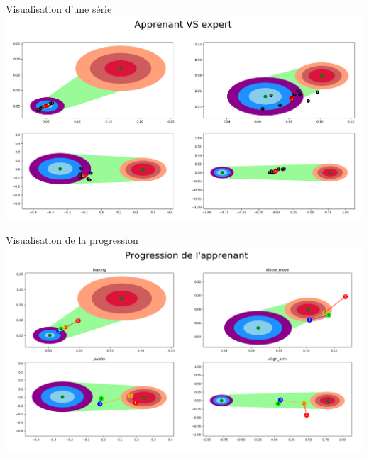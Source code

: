 \documentclass[svgnames]{beamer}
\begin{document}
	\begin{frame}{Visualisation d'une série}
		\centering
		\includegraphics[scale=0.27]{img/feedback_grp_example.png}
	\end{frame}
	
	\begin{frame}{Visualisation de la progression}
		\centering
		\includegraphics[scale=0.27]{img/progression.png}
	\end{frame}
	
\end{document}
